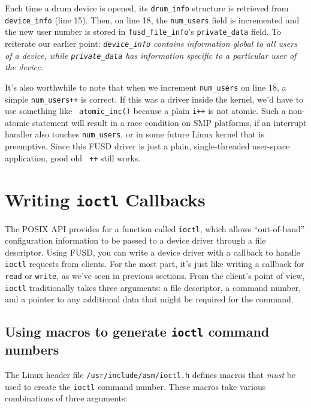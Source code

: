 \documentclass{article}
\begin{document}
Each time a drum device is opened, its {\tt drum\_info} structure is
retrieved from {\tt device\_info} (line 15).  Then, on line 18, the
{\tt num\_users} field is incremented and the new user number is
stored in {\tt fusd\_file\_info}'s {\tt private\_data} field.  To
reiterate our earlier point: {\em {\tt device\_info} contains
information global to all users of a device, while {\tt private\_data}
has information specific to a particular user of the device.}

It's also worthwhile to note that when we increment {\tt num\_users}
on line 18, a simple {\tt num\_users++} is correct.  If this was a
driver inside the kernel, we'd have to use something like {\tt
atomic\_inc()} because a plain {\tt i++} is not atomic.  Such a
non-atomic statement will result in a race condition on SMP platforms,
if an interrupt handler also touches {\tt num\_users}, or in some
future Linux kernel that is preemptive.  Since this FUSD driver is
just a plain, single-threaded user-space application, good old {\tt
++} still works.


\section{Writing {\tt ioctl} Callbacks}

The POSIX API provides for a function called {\tt ioctl}, which allows
``out-of-band'' configuration information to be passed to a device
driver through a file descriptor.  Using FUSD, you can write a device
driver with a callback to handle {\tt ioctl} requests from clients.
For the most part, it's just like writing a callback for {\tt read} or
{\tt write}, as we've seen in previous sections.  From the client's
point of view, {\tt ioctl} traditionally takes three arguments: a file
descriptor, a command number, and a pointer to any additional data
that might be required for the command.

\subsection{Using macros to generate {\tt ioctl} command numbers}

The Linux header file {\tt /usr/include/asm/ioctl.h} defines macros
that {\em must} be used to create the {\tt ioctl} command number.
These macros take various combinations of three arguments:
\end{document}
